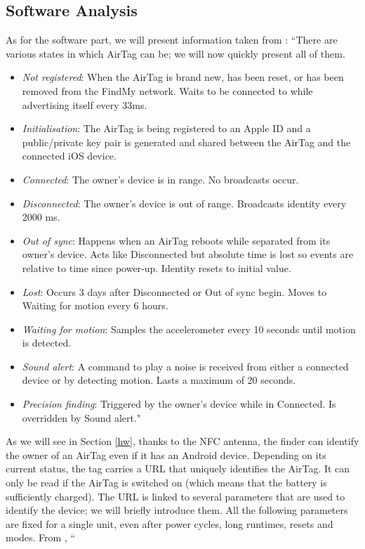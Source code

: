 \documentclass[english]{article}
\begin{document}
\subsection{Software Analysis}\label{sec:beacons}
As for the software part, we will present information taken from \cite{reverse}: ``There are various states in which AirTag can be; we will now quickly present all of them.
\begin{itemize}
  \item \textit{Not registered}: When the AirTag is brand new, has been reset, or has been removed from the FindMy network. Waits to be connected to while advertising itself every 33ms.
  \item \textit{Initialisation}: The AirTag is being registered to an Apple ID and a public/private key pair is generated and shared between the AirTag and the connected iOS device.
  \item \textit{Connected}: The owner’s device is in range. No broadcasts occur.
  \item \textit{Disconnected}: The owner’s device is out of range. Broadcasts identity every 2000 ms.
  \item \textit{Out of sync}: Happens when an AirTag reboots while separated from its owner’s device. Acts like Disconnected but absolute time is lost so events are relative to time since power-up. Identity resets to initial value.
  \item \textit{Lost}: Occurs 3 days after Disconnected or Out of sync begin. Moves to Waiting for motion every 6 hours.
  \item \textit{Waiting for motion}: Samples the accelerometer every 10 seconds until motion is detected.
  \item \textit{Sound alert}: A command to play a noise is received from either a connected device or by detecting motion. Lasts a maximum of 20 seconds.
  \item \textit{Precision finding}: Triggered by the owner’s device while in Connected. Is overridden by Sound alert."
\end{itemize}
As we will see in Section \ref{hw}, thanks to the NFC antenna, the finder can identify the owner of an AirTag even if it has an Android device. Depending on its current status, the tag carries a URL that uniquely identifies the AirTag. It can only be read if the AirTag is switched on (which means that the battery is sufficiently charged). The URL is linked to several parameters that are used to identify the device; we will briefly introduce them. All the following parameters are fixed for a single unit, even after power cycles, long runtimes, resets and modes. From \cite{reverse}, ``
\end{document}
